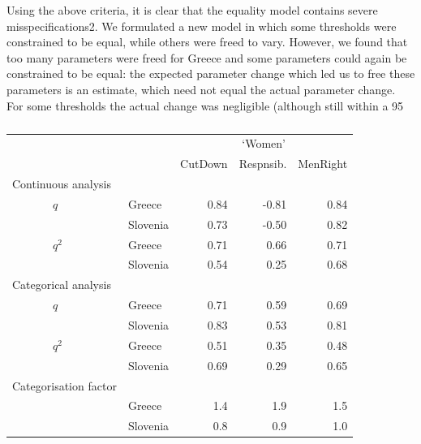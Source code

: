 \documentclass[a4paper,12pt]{article}
\begin{document}
Using the above criteria, it is clear that the equality model contains severe misspecifications2. We formulated a new model in which some thresholds were constrained to be equal, while others were freed to vary. However, we found that too many parameters were freed for Greece and some parameters could again be constrained to be equal: the expected parameter change which led us to free these parameters is an estimate, which need not equal the actual parameter change. For some thresholds the actual change was negligible (although still within a 95%

\begin{table}\centering\caption{\label{tab:women}}\begin{tabular}{lllrrr}
\hline
 &  &  & \multicolumn{3}{c}{`Women'} \\
 &  &  & CutDown & Respnsib. & MenRight\\
\hline
\multicolumn{2}{l}{Continuous analysis}\\
		   & $q$ & Greece & 0.84 & -0.81 & 0.84\\
 &  & Slovenia & 0.73 & -0.50 & 0.82\\
 & $q^2$ & Greece & 0.71 & 0.66 & 0.71\\
 &  & Slovenia & 0.54 & 0.25 & 0.68\\
\multicolumn{2}{l}{Categorical analysis}   &  &  &  & \\
 & $q$ & Greece & 0.71 & 0.59 & 0.69\\
 &  & Slovenia & 0.83 & 0.53 & 0.81\\
 & $q^2$ & Greece & 0.51 & 0.35 & 0.48\\
 &  & Slovenia & 0.69 & 0.29 & 0.65\\
 \multicolumn{2}{l}{Categorisation factor}   &  &  &  & \\
 &  & Greece & 1.4 & 1.9 & 1.5\\
 &  & Slovenia & 0.8 & 0.9 & 1.0\\
\hline
\end{tabular}\end{table}
\end{document}
